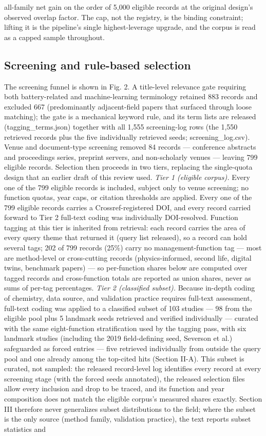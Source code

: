 \documentclass[journal]{IEEEtran}
\begin{document}
all-family net gain on the order of 5,000 eligible records at the original design's observed overlap factor. The cap, not the registry, is the binding constraint; lifting it is the pipeline's single highest-leverage upgrade, and the corpus is read as a capped sample throughout.

\subsection{Screening and rule-based selection}

The screening funnel is shown in Fig. 2. A title-level relevance gate requiring both battery-related and machine-learning terminology retained 883 records and excluded 667 (predominantly adjacent-field papers that surfaced through loose matching); the gate is a mechanical keyword rule, and its term lists are released (tagging\_terms.json) together with all 1,555 screening-log rows (the 1,550 retrieved records plus the five individually retrieved seeds; screening\_log.csv). Venue and document-type screening removed 84 records --- conference abstracts and proceedings series, preprint servers, and non-scholarly venues --- leaving 799 eligible records. Selection then proceeds in two tiers, replacing the single-quota design that an earlier draft of this review used. \textit{Tier 1 (eligible corpus).} Every one of the 799 eligible records is included, subject only to venue screening; no function quotas, year caps, or citation thresholds are applied. Every one of the 799 eligible records carries a Crossref-registered DOI, and every record carried forward to Tier 2 full-text coding was individually DOI-resolved. Function tagging at this tier is inherited from retrieval: each record carries the area of every query theme that returned it (query list released), so a record can hold several tags; 202 of 799 records (25\%) carry no management-function tag --- most are method-level or cross-cutting records (physics-informed, second life, digital twins, benchmark papers) --- so per-function shares below are computed over tagged records and cross-function totals are reported as union shares, never as sums of per-tag percentages. \textit{Tier 2 (classified subset).} Because in-depth coding of chemistry, data source, and validation practice requires full-text assessment, full-text coding was applied to a classified subset of 103 studies --- 98 from the eligible pool plus 5 landmark seeds retrieved and verified individually --- curated with the same eight-function stratification used by the tagging pass, with six landmark studies (including the 2019 field-defining seed, Severson et al.) safeguarded as forced entries --- five retrieved individually from outside the query pool and one already among the top-cited hits (Section II-A). This subset is curated, not sampled: the released record-level log identifies every record at every screening stage (with the forced seeds annotated), the released selection files allow every inclusion and drop to be traced, and its function and year composition does not match the eligible corpus's measured shares exactly. Section III therefore never generalizes subset distributions to the field; where the subset is the only source (method family, validation practice), the text reports subset statistics and 
\end{document}
